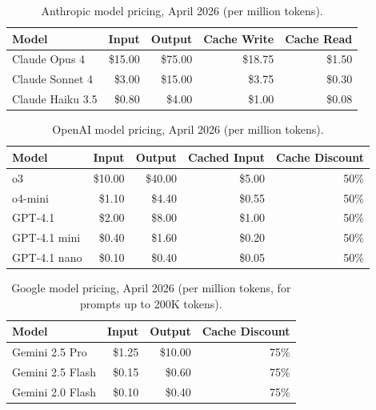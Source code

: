 \documentclass[11pt, a4paper, copyright]{googledeepmind}
\begin{document}
\begin{appendices}
\begin{table}[H]
\centering
\caption{Anthropic model pricing, April 2026 (per million tokens).}
\label{tab:anthropic-pricing}
\begin{tabular}{lrrrr}
\toprule
\textbf{Model} & \textbf{Input} & \textbf{Output} & \textbf{Cache Write} & \textbf{Cache Read} \\
\midrule
Claude Opus 4 & \$15.00 & \$75.00 & \$18.75 & \$1.50 \\
Claude Sonnet 4 & \$3.00 & \$15.00 & \$3.75 & \$0.30 \\
Claude Haiku 3.5 & \$0.80 & \$4.00 & \$1.00 & \$0.08 \\
\bottomrule
\end{tabular}
\end{table}

\begin{table}[H]
\centering
\caption{OpenAI model pricing, April 2026 (per million tokens).}
\label{tab:openai-pricing}
\begin{tabular}{lrrrr}
\toprule
\textbf{Model} & \textbf{Input} & \textbf{Output} & \textbf{Cached Input} & \textbf{Cache Discount} \\
\midrule
o3 & \$10.00 & \$40.00 & \$5.00 & 50\% \\
o4-mini & \$1.10 & \$4.40 & \$0.55 & 50\% \\
GPT-4.1 & \$2.00 & \$8.00 & \$1.00 & 50\% \\
GPT-4.1 mini & \$0.40 & \$1.60 & \$0.20 & 50\% \\
GPT-4.1 nano & \$0.10 & \$0.40 & \$0.05 & 50\% \\
\bottomrule
\end{tabular}
\end{table}

\begin{table}[H]
\centering
\caption{Google model pricing, April 2026 (per million tokens, for prompts up to 200K tokens).}
\label{tab:google-pricing}
\begin{tabular}{lrrr}
\toprule
\textbf{Model} & \textbf{Input} & \textbf{Output} & \textbf{Cache Discount} \\
\midrule
Gemini 2.5 Pro & \$1.25 & \$10.00 & 75\% \\
Gemini 2.5 Flash & \$0.15 & \$0.60 & 75\% \\
Gemini 2.0 Flash & \$0.10 & \$0.40 & 75\% \\
\bottomrule
\end{tabular}
\end{table}


\end{appendices}
\end{document}
